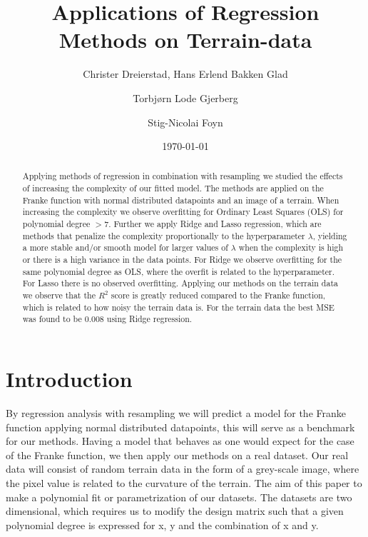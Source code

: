 \documentclass[%
 reprint,
nofootinbib,
 amsmath,amssymb,
 aps,
]{revtex4-2}
\begin{document}

\title{Applications of Regression Methods on Terrain-data}%

\author{Christer Dreierstad, Hans Erlend Bakken Glad}
\author{Torbjørn Lode Gjerberg}
\author{Stig-Nicolai Foyn}


\date{\today}

\begin{abstract}
Applying methods of regression in combination with resampling we studied the effects of increasing the complexity of our fitted model. The methods are applied on the Franke function with normal distributed datapoints and an image of a terrain. When increasing the complexity we observe overfitting for Ordinary Least Squares (OLS) for polynomial degree $>7$. Further we apply Ridge and Lasso regression, which are methods that penalize the complexity proportionally to the hyperparameter $\lambda$, yielding a more stable and/or smooth model for larger values of $\lambda$ when the complexity is high or there is a high variance in the data points. For Ridge we observe overfitting for the same polynomial degree as OLS, where the overfit is related to the hyperparameter. For Lasso there is no observed overfitting. Applying our methods on the terrain data we observe that the $R^2$ score is greatly reduced compared to the Franke function, which is related to how noisy the terrain data is. For the terrain data the best MSE was found to be 0.008 using Ridge regression.
\end{abstract}

\maketitle



\section{Introduction\label{sec:intro}}
By regression analysis with resampling we will predict a model for the Franke function applying normal distributed datapoints, this will serve as a benchmark for our methods. Having a model that behaves as one would expect for the case of the Franke function, we then apply our methods on a real dataset. Our real data will consist of random terrain data in the form of a grey-scale image, where the pixel value is related to the curvature of the terrain. The aim of this paper to make a polynomial fit or parametrization of our datasets. The datasets are two dimensional, which requires us to modify the design matrix such that a given polynomial degree is expressed for x, y and the combination of x and y.
\end{document}
